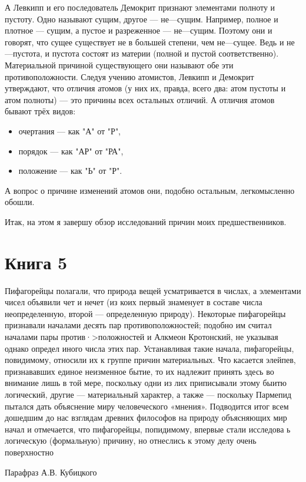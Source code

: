\documentclass[oneside, 17pt, dvipsnames]{extbook}
\begin{document}
А Левкипп и его последователь Демокрит признают элементами полноту и пустоту. Одно называют сущим, другое --- не---сущим. Например, полное и плотное --- сущим, а пустое и разреженное --- не---сущим. Поэтому они и говорят, что сущее существует не в большей степени, чем не---сущее. Ведь и не---пустота, и пустота состоят из материи (полной и пустой соответственно). Материальной причиной существующего они называют обе эти противоположности. Следуя учению атомистов, Левкипп и Демокрит утверждают, что отличия атомов (у них их, правда, всего два: атом пустоты и атом полноты) --- это причины всех остальных отличий. А отличия атомов бывают трёх видов:
\begin{itemize}
\item очертания --- как "А" от "Р",
\item порядок --- как "АР" от "РА",
\item положение --- как "Ь" от "Р".
\end{itemize}
А вопрос о причине изменений атомов они, подобно остальным, легкомысленно обошли.

Итак, на этом я завершу обзор исследований причин моих предшественников.





\newpage
\section{Книга 5}

\epigraph{
Пифагорейцы полагали, что природа вещей усматривается в числах, а элементами чисел объявили чет и нечет (из коих первый знаменует в составе числа неопределенную, второй --- определенную природу). Некоторые пифагорейцы признавали началами десять пар противоположностей; подобно им считал началами пары против·>положностей и Алкмеон Кротонский, не указывая однако определ иного числа этих пар. Устанавливая такие начала, пифагорейцы, повидимому, относили их к группе причин материальных. Что касается элейпев, признававших единое неизменное бытие, то их надлежит принять здесь во внимание лишь в той мере, поскольку одни из лих приписывали этому быитю логический, другие --- материальный характер, а также --- поскольку Пармепид пытался дать объяснение миру человеческого «мнения». Подводится итог всем дошедшим до нас взглядам древних философов на природу объясняющих мир начал и отмечается, что пифагорейцы, попидимому, впервые стали исследова ь логическую (формальную) причину, но отнеслись к этому делу очень поверхностно
}{Парафраз А.В. Кубицкого}
\end{document}
